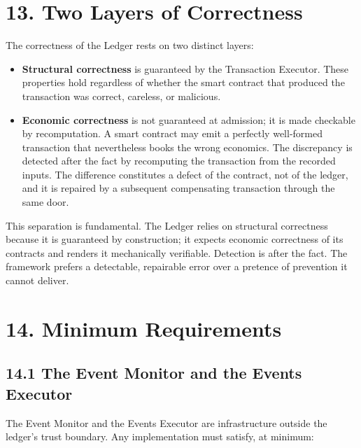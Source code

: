 \documentclass[11pt,a4paper]{article}
\newcommand{\clabel}[1]{\leavevmode\hypertarget{clause-#1}{}%
  \marginpar{\raggedright\scriptsize\ttfamily\textcolor{gray}{#1}}}
\providecommand{\tightlist}{\setlength{\itemsep}{2pt}\setlength{\parskip}{0pt}}
\begin{document}
\hypertarget{two-layers-of-correctness}{%
\section{13. Two Layers of
Correctness}\label{two-layers-of-correctness}}

The correctness of the Ledger rests on two distinct layers:

\begin{itemize}
\tightlist
\item
  \clabel{C-13.1}\textbf{Structural correctness} is guaranteed by the Transaction
  Executor. These properties hold regardless of whether the smart
  contract that produced the transaction was correct, careless, or
  malicious.
\item
  \clabel{C-13.2}\textbf{Economic correctness} is not guaranteed at admission; it is
  made checkable by recomputation. A smart contract may emit a perfectly
  well-formed transaction that nevertheless books the wrong economics.
  The discrepancy is detected after the fact by recomputing the
  transaction from the recorded inputs. The difference constitutes a
  defect of the contract, not of the ledger, and it is repaired by a
  subsequent compensating transaction through the same door.
\end{itemize}

This separation is fundamental. \clabel{C-13.3}The Ledger relies on structural
correctness because it is guaranteed by construction; it expects
economic correctness of its contracts and renders it mechanically
verifiable. Detection is after the fact. The framework prefers a
detectable, repairable error over a pretence of prevention it cannot
deliver.

\hypertarget{minimum-requirements}{%
\section{14. Minimum Requirements}\label{minimum-requirements}}

\hypertarget{the-event-monitor-and-the-events-executor}{%
\subsection{14.1 The Event Monitor and the Events
Executor}\label{the-event-monitor-and-the-events-executor}}

\clabel{C-14.1}The Event Monitor and the Events Executor are infrastructure outside the
ledger's trust boundary. Any implementation must satisfy, at minimum:
\end{document}

